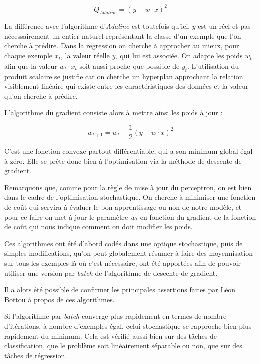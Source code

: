 \documentclass{article}
\begin{document}
\begin{equation*}
    Q_{Adaline} = (y - w \cdot x)^2
\end{equation*}

La différence avec l'algorithme d'\emph{Adaline} est toutefois qu'ici, $y$ est un réel et pas nécessairement un entier naturel représentant la classe d'un exemple que l'on cherche à prédire. Dans la regression on cherche à approcher au mieux, pour chaque exemple $x_t$, la valeur réelle $y_t$ qui lui est associée. On adapte les poids $w_t$ afin que la valeur $w_t \cdot x_t$ soit aussi proche que possible de $y_t$. L'utilisation du produit scalaire se justifie car on cherche un hyperplan approchant la relation visiblement linéaire qui existe entre les caractéristiques des données et la valeur qu'on cherche à prédire. 

L'algorithme du gradient consiste alors à mettre ainsi les poids à jour :

\begin{equation*}
    w_{t+1} = w_{t} - \frac{1}{2}(y - w \cdot x)^2
\end{equation*}

C'est une fonction convexe partout différentiable, qui a son minimum global égal à zéro. Elle se prête donc bien à l'optimisation via la méthode de descente de gradient.
\bigskip

Remarquons que, comme pour la règle de mise à jour du perceptron, on est bien dans le cadre de l'optimisation stochastique. On cherche à minimiser une fonction de coût qui servira à évaluer le bon apprentissage ou non de notre modèle, et pour ce faire on met à jour le paramètre $w_t$ en fonction du gradient de la fonction de coût qui nous indique comment on doit modifier les poids. 
\bigskip

Ces algorithmes ont été d'abord codés dans une optique stochastique, puis de simples modifications, qu'on peut globalement résumer à faire des moyennisation sur tous les exemples là où c'est nécessaire, ont été apportées afin de pouvoir utiliser une version par \emph{batch} de l'algorithme de descente de gradient. 
\bigskip

Il a alors été possible de confirmer les principales assertions faites par Léon Bottou à propos de ces algorithmes. \cite{Bottou98on-linelearning}
\bigskip

Si l'algorithme par \emph{batch} converge plus rapidement en termes de nombre d'itérations, à nombre d'exemples égal, celui stochastique se rapproche bien plus rapidement du minimum. Cela est vérifié aussi bien sur des tâches de classification, que le problème soit linéairement séparable ou non, que sur des tâches de régression.  
\bigskip
\end{document}
